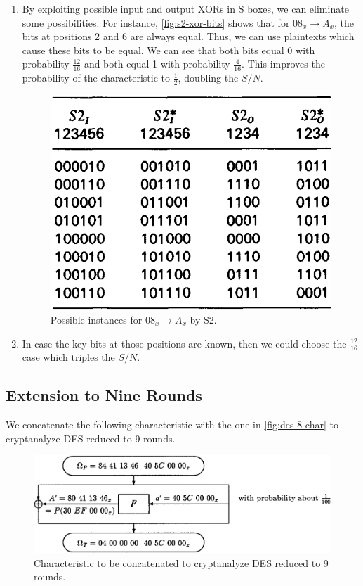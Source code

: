\documentclass[twoside]{article}
\begin{document}
\begin{enumerate}
    \item By exploiting possible input and output XORs in S boxes, we can
    eliminate some possibilities. For instance, \autoref{fig:s2-xor-bits} shows
    that for \(08_x \rightarrow A_x\), the bits at positions 2 and 6 are always
    equal. Thus, we can use plaintexts which cause these bits to be equal. We
    can see that both bits equal 0 with probability \(\frac{12}{16}\) and both
    equal 1 with probability \(\frac{4}{16}\). This improves the probability of
    the characteristic to \(\frac{1}{2}\), doubling the \(S/N\).  

    \begin{figure}[!ht]
        \centering
        \includegraphics[width=0.5\linewidth]{images/s2_xor_bits.png}
        \caption{Possible instances for \(08_x \rightarrow A_x\) by S2.}
        \label{fig:s2-xor-bits}
    \end{figure}

    \item In case the key bits at those positions are known, then we could
    choose the \(\frac{12}{16}\) case which triples the \(S/N\).
\end{enumerate}

\subsection{Extension to Nine Rounds}
We concatenate the following characteristic with the one in
\autoref{fig:des-8-char} to cryptanalyze DES reduced to 9 rounds.

\begin{figure}[!ht]
    \centering
    \includegraphics[width=0.5\linewidth]{images/des_9round_char.png}
    \caption{Characteristic to be concatenated to cryptanalyze DES reduced to 9 rounds.}
    \label{fig:des-9-char}
\end{figure}
\end{document}
